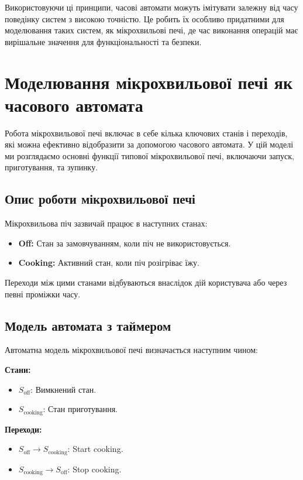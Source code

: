 \documentclass[12pt,a4paper]{article}
\begin{document}
Використовуючи ці принципи, часові автомати можуть імітувати залежну від часу поведінку систем з високою точністю. Це робить їх особливо придатними для моделювання таких систем, як мікрохвильові печі, де час виконання операцій має вирішальне значення для функціональності та безпеки.

\section{Моделювання мікрохвильової печі як часового автомата}

Робота мікрохвильової печі включає в себе кілька ключових станів і переходів, які можна ефективно відобразити за допомогою часового автомата. У цій моделі ми розглядаємо основні функції типової мікрохвильової печі, включаючи запуск, приготування, та зупинку.

\subsection{Опис роботи мікрохвильової печі}
Мікрохвильова піч зазвичай працює в наступних станах:
\begin{itemize}
    \item \textbf{Off:} Стан за замовчуванням, коли піч не використовується.
    \item \textbf{Cooking:} Активний стан, коли піч розігріває їжу.
\end{itemize}

Переходи між цими станами відбуваються внаслідок дій користувача або через певні проміжки часу.

\subsection{Модель автомата з таймером}
Автоматна модель мікрохвильової печі визначається наступним чином:

\vspace{0.5cm}

\textbf{Стани:}
\begin{itemize}
    \item \( S_{\text{off}} \): Вимкнений стан.
    \item \( S_{\text{cooking}} \): Стан приготування.
\end{itemize}

\textbf{Переходи:}
\begin{itemize}
    \item \( S_{\text{off}} \rightarrow S_{\text{cooking}} \): Start cooking.
    \item \( S_{\text{cooking}} \rightarrow S_{\text{off}} \): Stop cooking.
\end{itemize}
\end{document}
